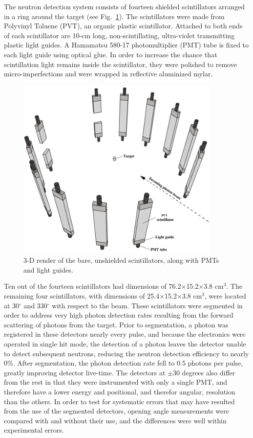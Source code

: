 The neutron detection system consists of fourteen shielded scintillators arranged in a ring around the target (see Fig.~\ref{fig:DetGeom}).
The scintillators were made from Polyvinyl Toluene (PVT), an organic plastic scintillator.
Attached to both ends of each scintillator are 10-cm long, non-scintillating, ultra-violet transmitting plastic light guides.
A Hamamatsu 580-17 photomultiplier (PMT) tube is fixed to each light guide using optical glue.
In order to increase the chance that scintillation light remains inside the scintillator, they were polished to remove micro-imperfections and were wrapped in reflective aluminized mylar.

\begin{figure}[]
    \centering
    \includegraphics[width = 0.9\textwidth]{Content/Methods/Detectors.png}
    \caption{3-D render of the bare, unshielded scintillators, along with PMTs and light guides.}
    \label{fig:DetGeom}
\end{figure}

Ten out of the fourteen scintillators had dimensions of 76.2$\times$15.2$\times$3.8 cm$^3$.
The remaining four scintillators, with dimensions of 25.4$\times$15.2$\times$3.8 cm$^3$, were located at 30$^{\circ}$ and 330$^{\circ}$ with respect to the beam.
These scintillators were segmented in order to address very high photon detection rates resulting from the forward scattering of photons from the target.
Prior to segmentation, a photon was registered in these detectors nearly every pulse, and because the electronics were operated in single hit mode, the detection of a photon leaves the detector unable to detect subsequent neutrons, reducing the neutron detection efficiency to nearly 0\%.
After segmentation, the photon detection rate fell to 0.5 photons per pulse, greatly improving detector live-time.
The detectors at $\pm$30 degrees also differ from the rest in that they were instrumented with only a single PMT, and therefore have a lower energy and positional, and therefor angular, resolution than the others.
In order to test for systematic errors that may have resulted from the use of the segmented detectors, opening angle measurements were compared with and without their use, and the differences were well within experimental errors.


